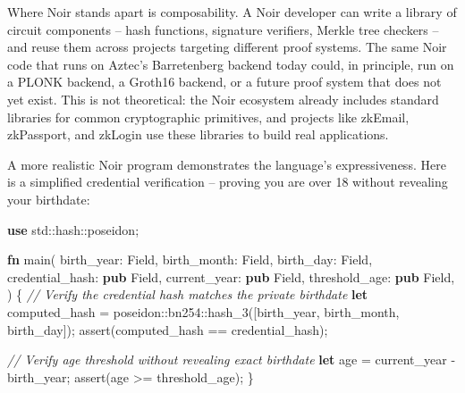 \documentclass[
  11pt,
  openany]{report}
\newenvironment{Shaded}{\begin{snugshade}}{\end{snugshade}}
\newcommand{\CommentTok}[1]{\textcolor[rgb]{0.50,0.54,0.62}{\textit{#1}}}
\newcommand{\KeywordTok}[1]{\textcolor[rgb]{0.62,0.65,1.00}{\textbf{#1}}}
\newcommand{\NormalTok}[1]{\textcolor[rgb]{0.78,0.80,0.85}{#1}}
\newcommand{\OperatorTok}[1]{\textcolor[rgb]{0.78,0.80,0.85}{#1}}
\newcommand{\PreprocessorTok}[1]{\textcolor[rgb]{0.62,0.65,1.00}{#1}}
\renewcommand{\textbf}[1]{{\bfseries\color{MidnightBold}#1}}
\renewenvironment{Shaded}{%
  \begin{tcolorbox}[
    colback=MidnightCode,
    colframe=MidnightBorder,
    arc=4pt,
    boxrule=0.5pt,
    left=8pt, right=8pt, top=6pt, bottom=6pt,
    breakable, enhanced
  ]%
}{\end{tcolorbox}}
\begin{document}
Where Noir stands apart is composability. A Noir developer can write a library
of circuit components -- hash functions, signature verifiers, Merkle tree
checkers -- and reuse them across projects targeting different proof systems.
The same Noir code that runs on Aztec's Barretenberg backend today could, in
principle, run on a PLONK backend, a Groth16 backend, or a future proof system
that does not yet exist. This is not theoretical: the Noir ecosystem already
includes standard libraries for common cryptographic primitives, and projects
like zkEmail, zkPassport, and zkLogin use these libraries to build real
applications.

A more realistic Noir program demonstrates the language's expressiveness. Here
is a simplified credential verification -- proving you are over 18 without
revealing your birthdate:

\begin{Shaded}
\begin{Highlighting}[]
\KeywordTok{use} \PreprocessorTok{std::hash::}\NormalTok{poseidon}\OperatorTok{;}

\KeywordTok{fn}\NormalTok{ main(}
\NormalTok{    birth\_year}\OperatorTok{:}\NormalTok{ Field}\OperatorTok{,}
\NormalTok{    birth\_month}\OperatorTok{:}\NormalTok{ Field}\OperatorTok{,}
\NormalTok{    birth\_day}\OperatorTok{:}\NormalTok{ Field}\OperatorTok{,}
\NormalTok{    credential\_hash}\OperatorTok{:} \KeywordTok{pub}\NormalTok{ Field}\OperatorTok{,}
\NormalTok{    current\_year}\OperatorTok{:} \KeywordTok{pub}\NormalTok{ Field}\OperatorTok{,}
\NormalTok{    threshold\_age}\OperatorTok{:} \KeywordTok{pub}\NormalTok{ Field}\OperatorTok{,}
\NormalTok{) }\OperatorTok{\{}
    \CommentTok{// Verify the credential hash matches the private birthdate}
    \KeywordTok{let}\NormalTok{ computed\_hash }\OperatorTok{=} \PreprocessorTok{poseidon::bn254::}\NormalTok{hash\_3([birth\_year}\OperatorTok{,}\NormalTok{ birth\_month}\OperatorTok{,}\NormalTok{ birth\_day])}\OperatorTok{;}
\NormalTok{    assert(computed\_hash }\OperatorTok{==}\NormalTok{ credential\_hash)}\OperatorTok{;}

    \CommentTok{// Verify age threshold without revealing exact birthdate}
    \KeywordTok{let}\NormalTok{ age }\OperatorTok{=}\NormalTok{ current\_year }\OperatorTok{{-}}\NormalTok{ birth\_year}\OperatorTok{;}
\NormalTok{    assert(age }\OperatorTok{\textgreater{}=}\NormalTok{ threshold\_age)}\OperatorTok{;}
\OperatorTok{\}}
\end{Highlighting}
\end{Shaded}
\end{document}
